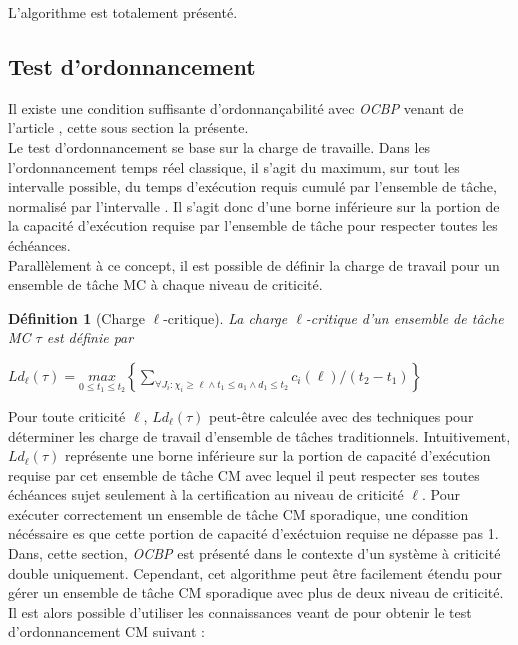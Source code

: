 \documentclass[12pt,a4paper,oneside]{book}
\theoremstyle{break}
\newtheorem{defin}{Définition}[chapter]
\theoremstyle{breakplain}
\begin{document}
L'algorithme est totalement présenté.


\subsection{Test d'ordonnancement}
Il existe une condition suffisante d'ordonnançabilité avec \textit{OCBP} venant de l'article \cite{ekberg2014bounding}, cette sous section la présente.\\

Le test d'ordonnancement se base sur la charge de travaille. Dans les l'ordonnancement temps réel classique, il s'agit du maximum, sur tout les intervalle possible, du temps d'exécution requis cumulé par l'ensemble de tâche, normalisé par l'intervalle \cite{ekberg2014bounding}. Il s'agit donc d'une borne inférieure sur la portion de la capacité d'exécution requise par l'ensemble de tâche pour respecter toutes les échéances.\\
Parallèlement à ce concept, il est possible de définir la charge de travail pour un ensemble de tâche MC à chaque niveau de criticité.

\begin{defin}[Charge $\ell$-critique]
La charge $\ell$-critique d'un ensemble de tâche MC $\tau$ est définie par 
\begin{center}
$Ld_\ell(\tau) = \underset{0\leq t_1 \leq t_2}{max} \left\lbrace \underset{\forall J_i:\chi_i \geq \ell \wedge t_1 \leq a_1\wedge d_1\leq t_2}{\sum} c_i(\ell)/(t_2-t_1) \right\rbrace$
\end{center}
\end{defin}

Pour toute criticité $\ell$, $Ld_\ell(\tau)$ peut-être calculée avec des techniques pour déterminer les charge de travail d'ensemble de tâches traditionnels\cite{Baker05algorithmsfor}. Intuitivement, $Ld_\ell(\tau)$ représente une borne inférieure sur la portion de capacité d'exécution requise par cet ensemble de tâche CM avec lequel il peut respecter ses toutes échéances sujet seulement à la certification au niveau de criticité $\ell$. Pour exécuter correctement un ensemble de tâche CM sporadique, une condition nécéssaire es que cette portion de capacité d'exéctuion requise ne dépasse pas 1.\\

Dans, cette section, \textit{OCBP} est présenté dans le contexte d'un système à criticité double uniquement. Cependant, cet algorithme peut être facilement étendu pour gérer un ensemble de tâche CM sporadique avec plus de deux niveau de criticité. Il est alors possible d'utiliser les connaissances veant de \cite{baruah2010mixed} pour obtenir le test d'ordonnancement CM suivant :
\end{document}
